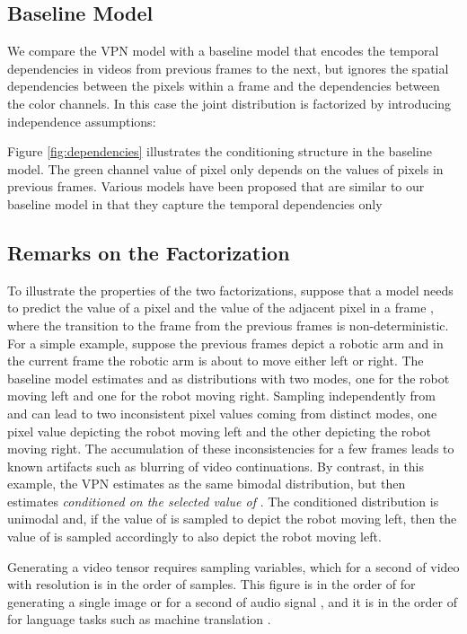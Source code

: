 \documentclass{article}
\begin{document}
\subsection{Baseline Model}

We compare the VPN model with a baseline model that encodes the temporal dependencies in videos from previous frames to the next, but ignores the spatial dependencies between the pixels within a frame and the dependencies between the color channels. In this case the joint distribution is factorized by introducing independence assumptions:

Figure \ref{fig:dependencies} illustrates the conditioning structure in the baseline model. The green channel value of pixel  only depends on the values of pixels in previous frames. Various models have been proposed that are similar to our baseline model in that they capture the temporal dependencies only \citep{DBLP:journals/corr/RanzatoSBMCC14,ICML-2015-SrivastavaMS,DBLP:conf/nips/OhGLLS15}

\subsection{Remarks on the Factorization}
\label{sec:discussion}

To illustrate the properties of the two factorizations, suppose that a model needs to predict the value of a pixel  and the value of the adjacent pixel  in a frame , where the transition to the frame  from the previous frames  is non-deterministic. For a simple example, suppose the previous frames  depict a robotic arm and in the current frame  the robotic arm is about to move either left or right. The baseline model estimates  and  as distributions with two modes, one for the robot moving left and one for the robot moving right. Sampling independently from  and  can lead to two inconsistent pixel values coming from distinct modes, one pixel value depicting the robot moving left and the other depicting the robot moving right. The accumulation of these inconsistencies for a few frames leads to known artifacts such as blurring of video continuations. By contrast, in this example, the VPN estimates  as the same bimodal distribution, but then estimates  \emph{conditioned on the selected value of} . The conditioned distribution is unimodal and, if the value of  is sampled to depict the robot moving left, then the value of  is sampled accordingly to also depict the robot moving left. 

Generating a video tensor requires sampling  variables, which for a second of video with resolution  is in the order of  samples. This figure is in the order of  for generating a single image or for a second of audio signal \citep{wavenet}, and it is in the order of  for language tasks such as machine translation \citep{DBLP:conf/emnlp/KalchbrennerB13}.
 
\end{document}
